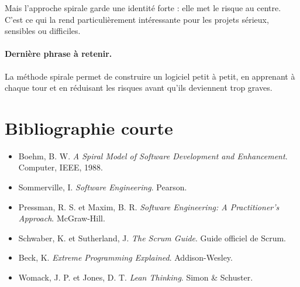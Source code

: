 \documentclass[12pt,a4paper]{article}
\begin{document}
Mais l'approche spirale garde une identité forte : elle met le risque au centre. C'est ce qui la rend particulièrement intéressante pour les projets sérieux, sensibles ou difficiles.

\paragraph{Dernière phrase à retenir.}
La méthode spirale permet de construire un logiciel petit à petit, en apprenant à chaque tour et en réduisant les risques avant qu'ils deviennent trop graves.

\newpage

\section*{Bibliographie courte}

\begin{itemize}
    \item Boehm, B. W. \textit{A Spiral Model of Software Development and Enhancement}. Computer, IEEE, 1988.
    \item Sommerville, I. \textit{Software Engineering}. Pearson.
    \item Pressman, R. S. et Maxim, B. R. \textit{Software Engineering: A Practitioner's Approach}. McGraw-Hill.
    \item Schwaber, K. et Sutherland, J. \textit{The Scrum Guide}. Guide officiel de Scrum.
    \item Beck, K. \textit{Extreme Programming Explained}. Addison-Wesley.
    \item Womack, J. P. et Jones, D. T. \textit{Lean Thinking}. Simon \& Schuster.
\end{itemize}
\end{document}
